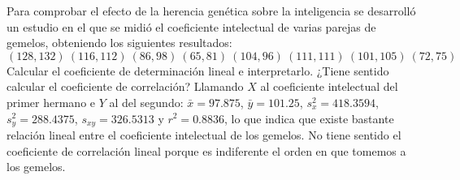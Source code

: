 {Para comprobar el efecto de la herencia genética sobre la inteligencia se desarrolló un estudio en el que se midió el
coeficiente intelectual de varias parejas de gemelos, obteniendo los siguientes resultados:
\[
(128, 132)\ (116, 112)\ (86, 98)\ (65, 81)\ (104,96)\ (111,111)\ (101, 105)\ (72,75)
\]
Calcular el coeficiente de determinación lineal e interpretarlo.
¿Tiene sentido calcular el coeficiente de correlación?
}
{Llamando $X$ al coeficiente intelectual del primer hermano e $Y$ al del segundo: $\bar x=97.875$, $\bar y=101.25$,
$s_x^2=418.3594$, $s_y^2=288.4375$, $s_{xy}=326.5313$ y $r^2=0.8836$, lo que indica que existe bastante relación
lineal entre el coeficiente intelectual de los gemelos. No tiene sentido el coeficiente de correlación lineal porque es
indiferente el orden en que tomemos a los gemelos.
}
{}


